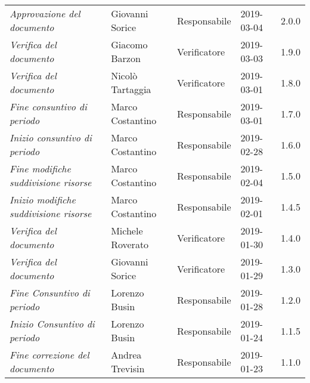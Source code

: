 \newpage
\section*{}
	\begin{longtable}{p{4cm}|C{3cm}|C{3cm}|R{2.5cm}|R{2cm}}

		 & & & & \\
		\endhead

		\emph{Approvazione del documento} & Giovanni Sorice & Responsabile & 2019-03-04 & 2.0.0 \\
		\hline

		\emph{Verifica del documento} & Giacomo Barzon & Verificatore & 2019-03-03 & 1.9.0 \\
		\hline

		\emph{Verifica del documento} & Nicolò Tartaggia & Verificatore & 2019-03-01 & 1.8.0 \\
		\hline

		\emph{Fine  consuntivo di periodo} & Marco Costantino & Responsabile & 2019-03-01 & 1.7.0 \\
		\hline

		\emph{Inizio consuntivo di periodo} & Marco Costantino & Responsabile & 2019-02-28 & 1.6.0 \\
		\hline

		\emph{Fine modifiche suddivisione risorse} & Marco Costantino & Responsabile & 2019-02-04 & 1.5.0 \\
		\hline

		\emph{Inizio modifiche suddivisione risorse} & Marco Costantino & Responsabile & 2019-02-01 & 1.4.5 \\
		\hline

		\emph{Verifica del documento} & Michele Roverato & Verificatore & 2019-01-30 & 1.4.0 \\
		\hline

		\emph{Verifica del documento} & Giovanni Sorice & Verificatore & 2019-01-29 & 1.3.0 \\
		\hline

		\emph{Fine Consuntivo di periodo} & Lorenzo Busin & Responsabile & 2019-01-28 & 1.2.0 \\
		\hline

		\emph{Inizio Consuntivo di periodo} & Lorenzo Busin & Responsabile & 2019-01-24 & 1.1.5 \\
		\hline

		\emph{Fine correzione del documento} & Andrea Trevisin & Responsabile & 2019-01-23 & 1.1.0 \\
		\hline


\end{longtable}
